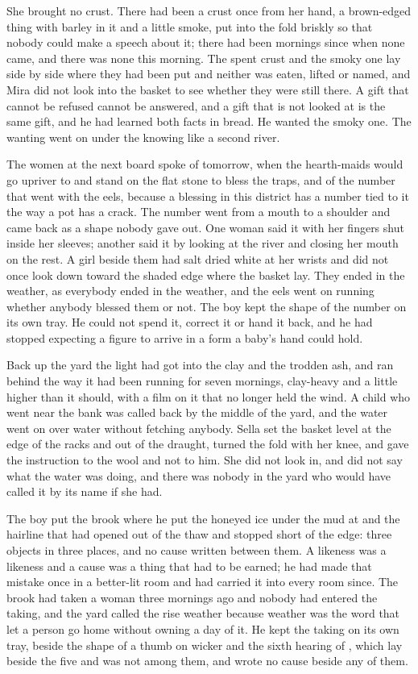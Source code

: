 She brought no crust. There had been a crust once from her hand, a brown-edged thing with barley in it and a little smoke, put into the fold briskly so that nobody could make a speech about it; there had been mornings since when none came, and there was none this morning. The spent crust and the smoky one lay side by side where they had been put and neither was eaten, lifted or named, and Mira did not look into the basket to see whether they were still there. A gift that cannot be refused cannot be answered, and a gift that is not looked at is the same gift, and he had learned both facts in bread. He wanted the smoky one. The wanting went on under the knowing like a second river.

The women at the next board spoke of  tomorrow, when the hearth-maids would go upriver to  and stand on the flat stone to bless the traps, and of the number that went with the eels, because a blessing in this district has a number tied to it the way a pot has a crack. The number went from a mouth to a shoulder and came back as a shape nobody gave out. One woman said it with her fingers shut inside her sleeves; another said it by looking at the river and closing her mouth on the rest. A girl beside them had salt dried white at her wrists and did not once look down toward the shaded edge where the basket lay. They ended in the weather, as everybody ended in the weather, and the eels went on running whether anybody blessed them or not. The boy kept the shape of the number on its own tray. He could not spend it, correct it or hand it back, and he had stopped expecting a figure to arrive in a form a baby's hand could hold.

\scenebreak

Back up the yard the light had got into the clay and the trodden ash, and  ran behind  the way it had been running for seven mornings, clay-heavy and a little higher than it should, with a film on it that no longer held the wind. A child who went near the bank was called back by the middle of the yard, and the water went on over water without fetching anybody. Sella set the basket level at the edge of the racks and out of the draught, turned the fold with her knee, and gave the instruction to the wool and not to him. She did not look in, and did not say what the water was doing, and there was nobody in the yard who would have called it by its name if she had.

The boy put the brook where he put the honeyed ice under the mud at  and the hairline that had opened out of the thaw and stopped short of the edge: three objects in three places, and no cause written between them. A likeness was a likeness and a cause was a thing that had to be earned; he had made that mistake once in a better-lit room and had carried it into every room since. The brook had taken a woman three mornings ago and nobody had entered the taking, and the yard called the rise weather because weather was the word that let a person go home without owning a day of it. He kept the taking on its own tray, beside the shape of a thumb on wicker and the sixth hearing of , which lay beside the five and was not among them, and wrote no cause beside any of them.

